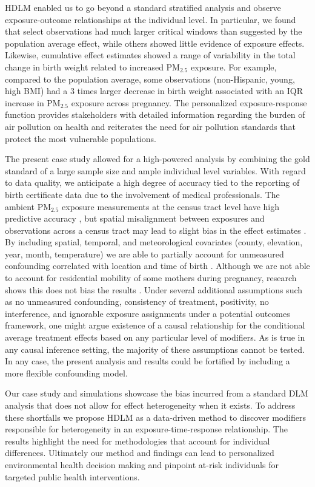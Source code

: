\documentclass[12pt]{article}
\begin{document}
HDLM enabled us to go beyond a standard stratified analysis and observe exposure-outcome relationships at the individual level. In particular, we found that select observations had much larger critical windows than suggested by the population average effect, while others showed little evidence of exposure effects. Likewise, cumulative effect estimates showed a range of variability in the total change in birth weight related to increased PM$_{2.5}$ exposure. For example, compared to the population average, some observations (non-Hispanic, young, high BMI) had a 3 times larger decrease in birth weight associated with an IQR increase in PM$_{2.5}$ exposure across pregnancy. The personalized exposure-response function provides stakeholders with detailed information regarding the burden of air pollution on health and reiterates the need for air pollution standards that protect the most vulnerable populations.

The present case study allowed for a high-powered analysis by combining the gold standard of a large sample size and ample individual level variables. With regard to data quality, we anticipate a high degree of accuracy tied to the reporting of birth certificate data due to the involvement of medical professionals. The ambient PM$_{2.5}$ exposure measurements at the census tract level have high predictive accuracy \citep{Berrocal2010AModels}, but spatial misalignment between exposures and observations across a census tract may lead to slight bias in the effect estimates \citep{Gryparis2009MeasurementEpidemiology}. By including spatial, temporal, and meteorological covariates (county, elevation, year, month, temperature) we are able to partially account for unmeasured confounding correlated with location and time of birth \citep{Lu2007OnEpidemiology}. Although we are not able to account for residential mobility of some mothers during pregnancy, research shows this does not bias the results \citep{Warren2018InvestigatingPregnancy}. Under several additional assumptions such as no unmeasured confounding, consistency of treatment, positivity, no interference, and ignorable exposure assignments under a potential outcomes framework, one might argue existence of a causal relationship for the conditional average treatment effects based on any particular level of modifiers. As is true in any causal inference setting, the majority of these assumptions cannot be tested. In any case, the present analysis and results could be fortified by including a more flexible confounding model.

Our case study and simulations showcase the bias incurred from a standard DLM analysis that does not allow for effect heterogeneity when it exists. To address these shortfalls we propose HDLM as a data-driven method to discover modifiers responsible for heterogeneity in an exposure-time-response relationship. The results highlight the need for methodologies that account for individual differences. Ultimately our method and findings can lead to personalized environmental health decision making and pinpoint at-risk individuals for targeted public health interventions. 
\end{document}
